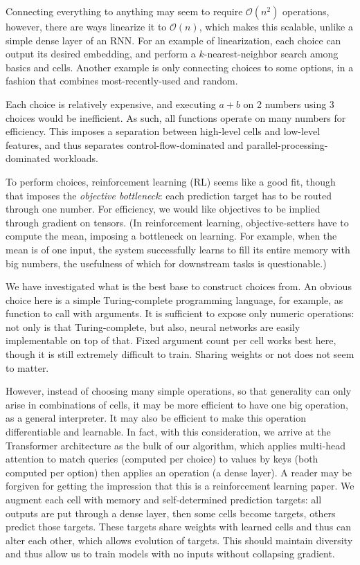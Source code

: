 \documentclass{article}
\begin{document}
Connecting everything to anything may seem to require $\mathcal{O}(n^2)$ operations, however, there are ways linearize it to $\mathcal{O}(n)$, which makes this scalable, unlike a simple dense layer of an RNN. For an example of linearization, each choice can output its desired embedding, and perform a $k$-nearest-neighbor search among basics and cells. Another example is only connecting choices to some options, in a fashion that combines most-recently-used and random.

Each choice is relatively expensive, and executing $a+b$ on 2 numbers using 3 choices would be inefficient. As such, all functions operate on many numbers for efficiency. This imposes a separation between high-level cells and low-level features, and thus separates control-flow-dominated and parallel-processing-dominated workloads.

To perform choices, reinforcement learning (RL) seems like a good fit, though that imposes the \textit{objective bottleneck}: each prediction target has to be routed through one number. For efficiency, we would like objectives to be implied through gradient on tensors. (In reinforcement learning, objective-setters have to compute the mean, imposing a bottleneck on learning. For example, when the mean is of one input, the system successfully learns to fill its entire memory with big numbers, the usefulness of which for downstream tasks is questionable.)

We have investigated what is the best base to construct choices from. An obvious choice here is a simple Turing-complete programming language, for example, as function to call with arguments. It is sufficient to expose only numeric operations: not only is that Turing-complete, but also, neural networks are easily implementable on top of that. Fixed argument count per cell works best here, though it is still extremely difficult to train. Sharing weights or not does not seem to matter.

However, instead of choosing many simple operations, so that generality can only arise in combinations of cells, it may be more efficient to have one big operation, as a general interpreter. It may also be efficient to make this operation differentiable and learnable. In fact, with this consideration, we arrive at the Transformer architecture \cite{vaswani2017attention} as the bulk of our algorithm, which applies multi-head attention to match queries (computed per choice) to values by keys (both computed per option) then applies an operation (a dense layer). A reader may be forgiven for getting the impression that this is a reinforcement learning paper. We augment each cell with memory and self-determined prediction targets: all outputs are put through a dense layer, then some cells become targets, others predict those targets. These targets share weights with learned cells and thus can alter each other, which allows evolution of targets. This should maintain diversity and thus allow us to train models with no inputs without collapsing gradient.
\end{document}
